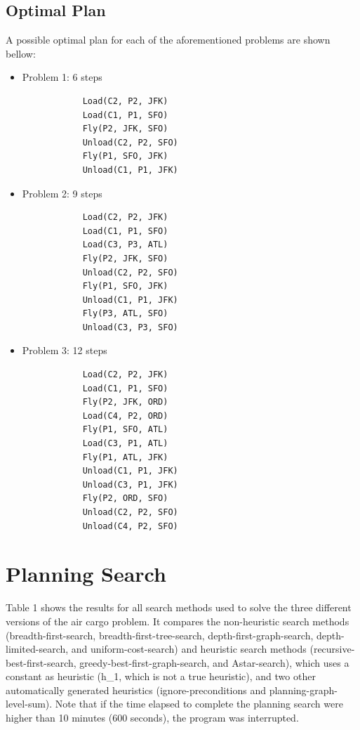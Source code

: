 \documentclass[12pt, a4paper]{article}
\begin{document}
	\subsection{Optimal Plan}
	
	A possible optimal plan for each of the aforementioned problems are shown bellow:
	
	\begin{itemize}
		\item Problem 1: 6 steps
		\begin{verbatim}
			Load(C2, P2, JFK)
			Load(C1, P1, SFO)
			Fly(P2, JFK, SFO)
			Unload(C2, P2, SFO)
			Fly(P1, SFO, JFK)
			Unload(C1, P1, JFK)
		\end{verbatim}
	
		\item Problem 2: 9 steps
		\begin{verbatim}
			Load(C2, P2, JFK)
			Load(C1, P1, SFO)
			Load(C3, P3, ATL)
			Fly(P2, JFK, SFO)
			Unload(C2, P2, SFO)
			Fly(P1, SFO, JFK)
			Unload(C1, P1, JFK)
			Fly(P3, ATL, SFO)
			Unload(C3, P3, SFO)
		\end{verbatim}
		
		\pagebreak
		
		\item Problem 3: 12 steps
		\begin{verbatim}
			Load(C2, P2, JFK)
			Load(C1, P1, SFO)
			Fly(P2, JFK, ORD)
			Load(C4, P2, ORD)
			Fly(P1, SFO, ATL)
			Load(C3, P1, ATL)
			Fly(P1, ATL, JFK)
			Unload(C1, P1, JFK)
			Unload(C3, P1, JFK)
			Fly(P2, ORD, SFO)
			Unload(C2, P2, SFO)
			Unload(C4, P2, SFO)
		\end{verbatim}
		
	\end{itemize}

	\section{Planning Search}
	
	Table 1 shows the results for all search methods used to solve the three different versions of the air cargo problem. It compares the non-heuristic search methods (breadth-first-search, breadth-first-tree-search, depth-first-graph-search, depth-limited-search, and uniform-cost-search) and heuristic search methods (recursive-best-first-search, greedy-best-first-graph-search, and Astar-search), which uses a constant as heuristic (h{\_}1, which is not a true heuristic), and two other automatically generated heuristics (ignore-preconditions and planning-graph-level-sum). Note that if the time elapsed to complete the planning search were higher than 10 minutes (600 seconds), the program was interrupted.
	
\end{document}
